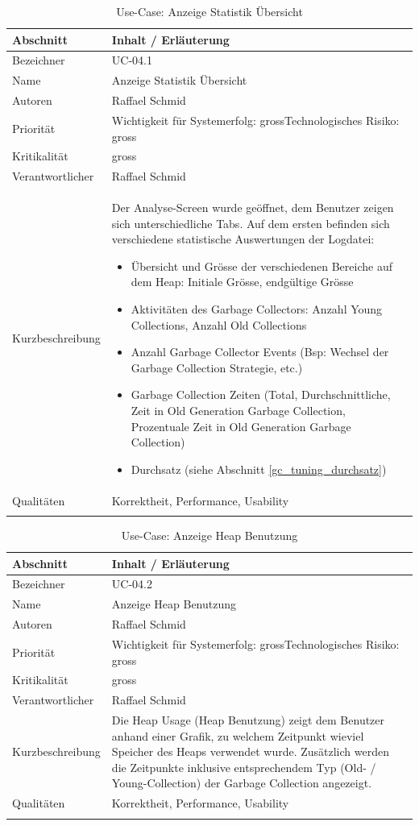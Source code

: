 \begin{longtable}{|p{4cm}|p{10.5cm}|}
\hline
   \textbf{Abschnitt} & \textbf{Inhalt / Erläuterung} \\\hline
   Bezeichner & UC-04.1\\\hline
   Name & Anzeige Statistik Übersicht\\\hline
   Autoren & Raffael Schmid\\\hline
   Priorität & Wichtigkeit für Systemerfolg: gross\newline Technologisches Risiko: gross\\\hline
   Kritikalität & gross\\\hline
   Verantwortlicher & Raffael Schmid\\\hline
   Kurzbeschreibung & Der Analyse-Screen wurde geöffnet, dem Benutzer zeigen sich unterschiedliche Tabs. Auf dem ersten befinden sich verschiedene statistische Auswertungen der Logdatei:
   \begin{itemize}
	\item Übersicht und Grösse der verschiedenen Bereiche auf dem Heap: Initiale Grösse, endgültige Grösse
	\item Aktivitäten des Garbage Collectors: Anzahl Young Collections, Anzahl Old Collections
	\item Anzahl Garbage Collector Events (Bsp: Wechsel der Garbage Collection Strategie, etc.)
	\item Garbage Collection Zeiten (Total, Durchschnittliche, Zeit in Old Generation Garbage Collection, Prozentuale Zeit in Old Generation Garbage Collection)
	\item Durchsatz (siehe Abschnitt \ref{gc_tuning_durchsatz})
   \end{itemize}
 \\\hline
   Qualitäten &  Korrektheit, Performance, Usability\\\hline
\caption{Use-Case: Anzeige Statistik Übersicht}
\end{longtable}

\begin{longtable}{|p{4cm}|p{10.5cm}|}
\hline
   \textbf{Abschnitt} & \textbf{Inhalt / Erläuterung} \\\hline
   Bezeichner & UC-04.2\\\hline
   Name & Anzeige Heap Benutzung\\\hline
   Autoren & Raffael Schmid\\\hline
   Priorität & Wichtigkeit für Systemerfolg: gross\newline Technologisches Risiko: gross\\\hline
   Kritikalität & gross\\\hline
   Verantwortlicher & Raffael Schmid\\\hline
   Kurzbeschreibung & Die Heap Usage (Heap Benutzung) zeigt dem Benutzer anhand einer Grafik, zu welchem Zeitpunkt wieviel Speicher des Heaps verwendet wurde. Zusätzlich werden die Zeitpunkte inklusive entsprechendem Typ (Old- / Young-Collection) der Garbage Collection angezeigt.  \\\hline
   Qualitäten & Korrektheit, Performance, Usability\\\hline
\caption{Use-Case: Anzeige Heap Benutzung}
\end{longtable}


